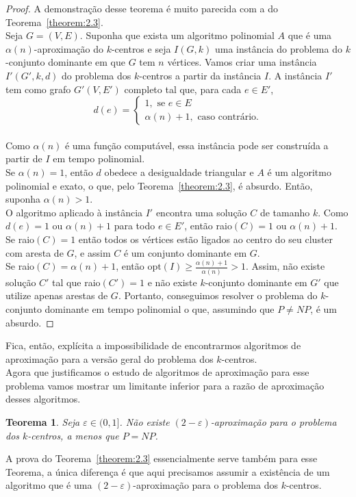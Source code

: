 \documentclass[12pt]{article}
\newcommand{\opt}{\ensuremath{\mathrm{opt}}}
\newtheorem{theorem}{Teorema}[section]
\newcommand{\NP}{\mathit{NP}}
\begin{document}
\begin{proof}
        A demonstração desse teorema é muito parecida com a do Teorema~\ref{theorem:2.3}. \\
        Seja $G = (V,E)$. Suponha que exista um algoritmo polinomial $A$ que é uma $\alpha(n)$-aproximação do $k$-centros e seja $I(G,k)$ uma instância do problema do $k$-conjunto dominante em que $G$ tem $n$ vértices. Vamos criar uma instância $I'(G',k,d)$ do problema dos $k$-centros a partir da instância $I$. A instância $I'$ tem como grafo $G'(V,E')$ completo tal que, para cada $e \in E'$, \\
    \[d(e) = \begin{cases}
            1, \text{ se } e \in E \\
            \alpha(n)+1, \text{ caso contrário.} 
            \end{cases}\]\\
    Como $\alpha(n)$ é uma função computável, essa instância pode ser construída a partir de $I$ em tempo polinomial. \\
    Se $\alpha(n)=1$, então $d$ obedece a desigualdade triangular e $A$ é um algoritmo polinomial e exato, o que, pelo Teorema~\ref{theorem:2.3}, é absurdo. Então, suponha $\alpha(n)>1$. \\
    O algoritmo aplicado à instância $I'$ encontra uma solução $C$ de tamanho $k$. Como $d(e) = 1$ ou $\alpha(n)+1$ para todo $e \in E'$, então raio$(C)=1$ ou $\alpha(n)+1$.\\
    Se raio$(C)=1$ então todos os vértices estão ligados ao centro do seu cluster com aresta de $G$, e assim $C$ é um conjunto dominante em $G$. \\
    Se raio$(C) = \alpha(n) + 1$, então $\opt(I) \geq \frac{\alpha(n)+1}{\alpha(n)}>1$. Assim, não existe solução $C'$ tal que raio$(C')=1$ e não existe $k$-conjunto dominante em $G'$ que utilize apenas arestas de $G$.
    Portanto, conseguimos resolver o problema do $k$-conjunto dominante em tempo polinomial o que, assumindo que $P \not= \NP$, é um absurdo.
\end{proof}
    Fica, então, explícita a impossibilidade de encontrarmos algoritmos de aproximação para a versão geral do problema dos $k$-centros.\\
    Agora que justificamos o estudo de algoritmos de aproximação para esse problema vamos mostrar um limitante inferior para a razão de aproximação desses algoritmos.
    
    \begin{theorem}
        Seja $\varepsilon \in (0,1]$. Não existe $(2-\varepsilon)$-aproximação para o problema dos $k$-centros, a menos que $P=\NP$.
    \end{theorem}
    A prova do Teorema~\ref{theorem:2.3} essencialmente serve também para esse Teorema, a única diferença é que aqui precisamos assumir a existência de um algoritmo que é uma $(2 - \varepsilon)$-aproximação para o problema dos $k$-centros.
\end{document}
